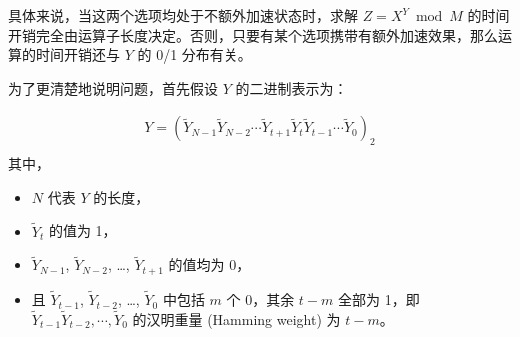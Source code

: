 \documentclass[main\_\_CN.tex]{subfiles}
\begin{document}
具体来说，当这两个选项均处于不额外加速状态时，求解 \begin{math}Z = X^{Y} \bmod M\end{math} 的时间开销完全由运算子长度决定。否则，只要有某个选项携带有额外加速效果，那么运算的时间开销还与 \begin{math}Y\end{math} 的 0/1 分布有关。

为了更清楚地说明问题，首先假设 \begin{math}Y \end{math} 的二进制表示为：

\begin{gather*}
Y = ( \widetilde{Y}_{N-1} \widetilde{Y}_{N-2} \cdots \widetilde{Y}_{t+1} \widetilde{Y}_{t} \widetilde{Y}_{t-1} \cdots \widetilde{Y}_{0} )_{2} \\
\end{gather*}
其中，
\begin{itemize}
    \item \begin{math} N \end{math} 代表 \begin{math}Y \end{math} 的长度，
    \item \begin{math}\widetilde{Y}_{t}\end{math} 的值为 1，
    \item \begin{math}\widetilde{Y}_{N-1}\end{math}, \begin{math}\widetilde{Y}_{N-2}\end{math}, \dots, \begin{math}\widetilde{Y}_{t+1}\end{math} 的值均为 0，
    \item 且 \begin{math}\widetilde{Y}_{t-1}\end{math}, \begin{math}\widetilde{Y}_{t-2}\end{math}, \dots, \begin{math}\widetilde{Y}_{0}\end{math} 中包括 \begin{math}m\end{math} 个 0，其余 \begin{math}t -m\end{math} 全部为 1，即 \begin{math}\widetilde{Y}_{t-1} \widetilde{Y}_{t-2}, \cdots, \widetilde{Y}_{0}\end{math} 的汉明重量 (Hamming weight) 为 \begin{math}t -m\end{math}。
\end{itemize}
\end{document}
